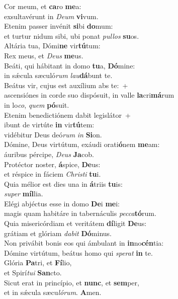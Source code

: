 \evenverse Cor meum, et \textbf{ca}ro \textbf{me}a:~\*\\
\evenverse exsultavérunt in \textit{De}\textit{um} \textbf{vi}vum.\\
\oddverse Etenim passer invénit \textbf{si}bi \textbf{do}mum:~\*\\
\oddverse et turtur nidum sibi, ubi ponat \textit{pul}\textit{los} \textbf{su}os.\\
\evenverse Altária tua, Dómi\textbf{ne} vir\textbf{tú}tum:~\*\\
\evenverse Rex meus, et \textit{De}\textit{us} \textbf{me}us.\\
\oddverse Beáti, qui hábitant in domo \textbf{tu}a, \textbf{Dó}mine:~\*\\
\oddverse in sǽcula sæculó\textit{rum} \textit{lau}\textbf{dá}bunt te.\\
\evenverse Beátus vir, cujus est auxílium abs te:~+\\
\evenverse  ascensiónes in corde suo dispósuit, in valle \textbf{la}cri\textbf{má}rum~\*\\
\evenverse in lo\textit{co}, \textit{quem} \textbf{pó}suit.\\
\oddverse Etenim benedictiónem dabit legislátor~+\\
\oddverse  ibunt de virtúte \textbf{in} vir\textbf{tú}tem:~\*\\
\oddverse vidébitur Deus deó\textit{rum} \textit{in} \textbf{Si}on.\\
\evenverse Dómine, Deus virtútum, exáudi orati\textbf{ó}nem \textbf{me}am:~\*\\
\evenverse áuribus pércipe, \textit{De}\textit{us} \textbf{Ja}cob.\\
\oddverse Protéctor noster, \textbf{á}spice, \textbf{De}us:~\*\\
\oddverse et réspice in fáciem \textit{Chri}\textit{sti} \textbf{tu}i.\\
\evenverse Quia mélior est dies una in \textbf{á}triis \textbf{tu}is:~\*\\
\evenverse \textit{su}\textit{per} \textbf{míl}lia.\\
\oddverse Elégi abjéctus esse in domo \textbf{De}i \textbf{me}i:~\*\\
\oddverse magis quam habitáre in tabernáculis \textit{pec}\textit{ca}\textbf{tó}rum.\\
\evenverse Quia misericórdiam et veritátem \textbf{dí}ligit \textbf{De}us:~\*\\
\evenverse grátiam et glóriam \textit{da}\textit{bit} \textbf{Dó}minus.\\
\oddverse Non privábit bonis eos qui ámbulant in \textbf{in}no\textbf{cén}tia:~\*\\
\oddverse Dómine virtútum, beátus homo qui \textit{spe}\textit{rat} \textbf{in} te.\\
\evenverse Glória \textbf{Pa}tri, et \textbf{Fí}lio,~\*\\
\evenverse et Spirí\textit{tu}\textit{i} \textbf{San}cto.\\
\oddverse Sicut erat in princípio, et \textbf{nunc}, et \textbf{sem}per,~\*\\
\oddverse et in sǽcula sæcu\textit{ló}\textit{rum}. \textbf{A}men.\\
